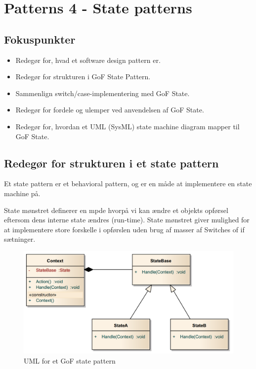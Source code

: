 \section{Patterns 4 - State patterns}

\subsection{Fokuspunkter}

\begin{itemize}
	\item Redegør for, hvad et software design pattern er.
	\item Redegør for strukturen i GoF State Pattern.
	\item Sammenlign  switch/case-implementering med GoF State.
	\item Redegør for fordele og ulemper ved anvendelsen af GoF State.
	\item Redegør for, hvordan et UML (SysML) state machine diagram mapper til GoF State.
\end{itemize}



\subsection{Redegør for strukturen i et state pattern}
Et state pattern er et behavioral pattern, og er en måde at implementere en state machine på.

State mønstret definerer en mpde hvorpå vi kan ændre et objekts opførsel eftersom dens interne state ændres (run-time).
State mønstret giver mulighed for at implementere store forskelle i opførslen uden brug af masser af Switches of if sætninger.

\begin{figure}[h]
\centering
\includegraphics[width=0.8\linewidth]{figs/newstate/statepattern_simple}
\caption{UML for et GoF state pattern}
\label{fig:gofState}
\end{figure}

